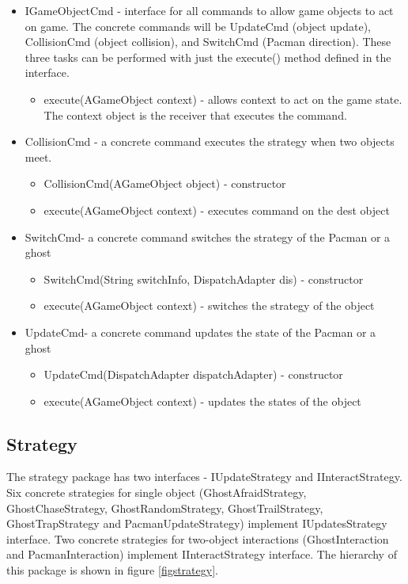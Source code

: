 \documentclass[letterpaper, 11pt]{article}
\begin{document}
\begin{itemize}
  \item IGameObjectCmd - interface for all commands to allow game objects to act on game. The concrete commands will be UpdateCmd (object update), CollisionCmd (object collision), and SwitchCmd (Pacman direction). These three tasks can be performed with just the execute() method defined in the interface. 
  \begin{itemize}
    \item execute(AGameObject context) - allows context to act on the game state. The context object is the receiver that executes the command.
  \end{itemize}
  \item CollisionCmd - a concrete command executes the strategy when two objects meet.
  \begin{itemize}
  \item CollisionCmd(AGameObject object) - constructor
  \item execute(AGameObject context) - executes command on the dest object
  \end{itemize}
  \item SwitchCmd- a concrete command switches the strategy of the Pacman or a ghost
  \begin{itemize}
  \item SwitchCmd(String switchInfo, DispatchAdapter dis) - constructor
  \item execute(AGameObject context) - switches the strategy of the object
  \end{itemize}
  \item UpdateCmd- a concrete command updates the state of the Pacman or a ghost
  \begin{itemize}
  \item UpdateCmd(DispatchAdapter dispatchAdapter) - constructor
  \item execute(AGameObject context) - updates the states of the object
  \end{itemize}
\end{itemize}

\subsection{Strategy}
The strategy package has two interfaces - IUpdateStrategy and IInteractStrategy. Six concrete strategies for single object (GhostAfraidStrategy, GhostChaseStrategy, GhostRandomStrategy, GhostTrailStrategy, GhostTrapStrategy and PacmanUpdateStrategy) implement IUpdatesStrategy interface. Two concrete strategies for two-object interactions (GhostInteraction and PacmanInteraction) implement IInteractStrategy interface. The hierarchy of this package is shown in figure \ref{figstrategy}.
\end{document}

